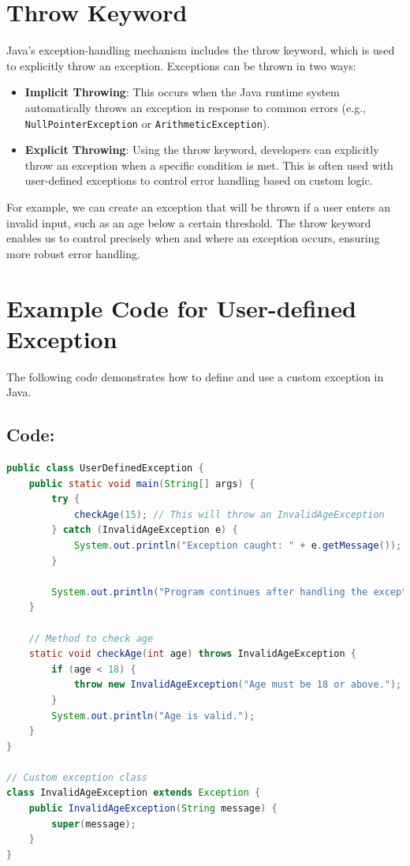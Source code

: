 \documentclass[a4paper,12pt]{article}
\begin{document}
\section{Throw Keyword}
Java’s exception-handling mechanism includes the throw keyword, which is used to explicitly throw an exception. Exceptions can be thrown in two ways:
\begin{itemize}
    \item \textbf{Implicit Throwing}: This occurs when the Java runtime system automatically throws an exception in response to common errors (e.g., \texttt{NullPointerException} or \texttt{ArithmeticException}).
    \item \textbf{Explicit Throwing}: Using the throw keyword, developers can explicitly throw an exception when a specific condition is met. This is often used with user-defined exceptions to control error handling based on custom logic.
\end{itemize}

For example, we can create an exception that will be thrown if a user enters an invalid input, such as an age below a certain threshold. The throw keyword enables us to control precisely when and where an exception occurs, ensuring more robust error handling.



\section{Example Code for User-defined Exception}

The following code demonstrates how to define and use a custom exception in Java.

\subsection{Code:}

\begin{lstlisting}[language=Java]
public class UserDefinedException {
    public static void main(String[] args) {
        try {
            checkAge(15); // This will throw an InvalidAgeException
        } catch (InvalidAgeException e) {
            System.out.println("Exception caught: " + e.getMessage());
        }

        System.out.println("Program continues after handling the exception.");
    }

    // Method to check age
    static void checkAge(int age) throws InvalidAgeException {
        if (age < 18) {
            throw new InvalidAgeException("Age must be 18 or above.");
        }
        System.out.println("Age is valid.");
    }
}

// Custom exception class
class InvalidAgeException extends Exception {
    public InvalidAgeException(String message) {
        super(message);
    }
}
\end{lstlisting}
\end{document}
